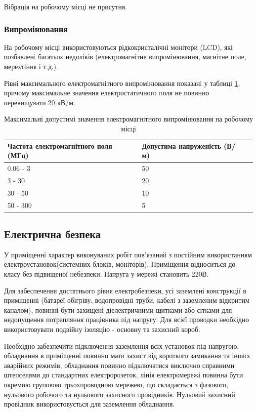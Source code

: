         Вібрація на робочому місці не присутня.

    \subsubsection{Випромінювання}
    На робочому місці використовуються рідкокристалічні монітори (LCD), які позбавлені багатьох недоліків (електромагнітне випромінювання, магнітне поле, мерехтіння і т.д.).

    Рівні максимального електромагнітного випромінювання показані у таблиці \ref{tab:lab-waves}, причому максимальне значення
    електростатичного поля не повинно перевищувати 20 кВ/м.

    \begin{table}[h]
        \caption{Максимальні допустимі значення електромагнітного випромінювання на робочому місці}
        \begin{tabularx}{\textwidth}{| X | X | X |}
            \hline
            Частота електромагнітного поля (МГц) & Допустима напруженість (В/м) \\ \hline
            0.06 - 3     & 50                      \\ \hline
            3 - 30     & 20                      \\ \hline
            30 - 50    & 10                    \\ \hline
            50 - 300   & 5                      \\ \hline
        \end{tabularx}
        \label{tab:lab-waves}
    \end{table}

\subsection{Електрична безпека}
    У приміщенні характер виконуваних робіт пов'язаний з постійним використанням електроустановок(системних блоків, моніторів). Приміщення відноситься до класу без підвищеної небезпеки. Напруга у мережі становить 220В.

    Для забеспечення достатнього рівня електробезпеки, усі заземлені конструкції в приміщенні (батареї обігріву, водопровідні труби, кабелі з заземленим відкритим каналом), повинні бути захищені діелектричними щитками або сітками для недопущення потрапляння працівника під напругу. Для всієї проводки необхідно використовувати подвійну ізоляцію - основну та захисний короб.

    Необхідно забезпечити підключення заземлення всіх установок під напругою, обладнання в приміщенні повинно мати захист від короткого замикання та інших аварійних режимів, обладнання повинно підключатися виключно справними штепселями до стандартних електророзеток, лінія електромережі повинна бути окремою груповою трьохпроводною мережею, що складається з фазового, нульового робочого та нульового захисного провідників. Нульовий захисний провідник використовується для заземлення обладнання.

